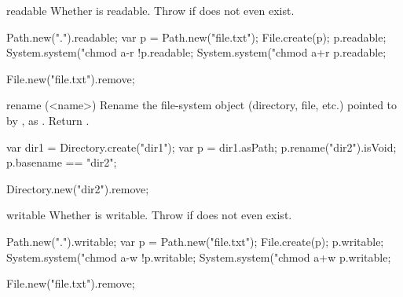 \begin{urbiscriptapi}
\item[readable]
  Whether \this is readable.  Throw if does not even exist.
\begin{urbiassert}
Path.new(".").readable;
var p = Path.new("file.txt");
File.create(p);
p.readable;
System.system("chmod a-r %
!p.readable;
System.system("chmod a+r %
p.readable;
\end{urbiassert}
\begin{urbicomment}
File.new("file.txt").remove;
\end{urbicomment}


\item[rename](<name>)%
  Rename the file-system object (directory, file, etc.) pointed to by \this,
  as .  Return .
\begin{urbiassert}
var dir1 = Directory.create("dir1");
var p = dir1.asPath;
p.rename("dir2").isVoid;
p.basename == "dir2";
\end{urbiassert}
\begin{urbicomment}
Directory.new("dir2").remove;
\end{urbicomment}


\item[writable]
  Whether \this is writable.  Throw if does not even exist.
\begin{urbiassert}
Path.new(".").writable;
var p = Path.new("file.txt");
File.create(p);
p.writable;
System.system("chmod a-w %
!p.writable;
System.system("chmod a+w %
p.writable;
\end{urbiassert}
\begin{urbicomment}
File.new("file.txt").remove;
\end{urbicomment}
\end{urbiscriptapi}


